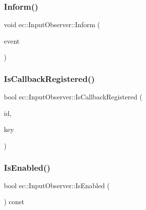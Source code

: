 \mbox{\label{classec_1_1_input_observer_a9d12b9998638708cae180340de2c8550}} 
\subsubsection{\texorpdfstring{Inform()}{Inform()}}
{\footnotesize\ttfamily void ec\+::\+Input\+Observer\+::\+Inform (\begin{DoxyParamCaption}\item[{const \mbox{\hyperlink{structec_1_1_input_event}{Input\+Event}} \&}]{event }\end{DoxyParamCaption})}

\mbox{\label{classec_1_1_input_observer_a72b0694089986db797bdf888fadbeed6}} 
\subsubsection{\texorpdfstring{Is\+Callback\+Registered()}{IsCallbackRegistered()}}
{\footnotesize\ttfamily bool ec\+::\+Input\+Observer\+::\+Is\+Callback\+Registered (\begin{DoxyParamCaption}\item[{const std\+::string \&}]{id,  }\item[{\mbox{\hyperlink{namespaceec_a5de6bdb8c4b2ed6e590e721ec998f964}{Event\+Key\+\_\+T}}}]{key }\end{DoxyParamCaption})}

\mbox{\label{classec_1_1_input_observer_ae962bf8854a535e24b7a529819003d43}} 
\subsubsection{\texorpdfstring{Is\+Enabled()}{IsEnabled()}}
{\footnotesize\ttfamily bool ec\+::\+Input\+Observer\+::\+Is\+Enabled (\begin{DoxyParamCaption}{ }\end{DoxyParamCaption}) const\hspace{0.3cm}{\ttfamily [virtual]}}

